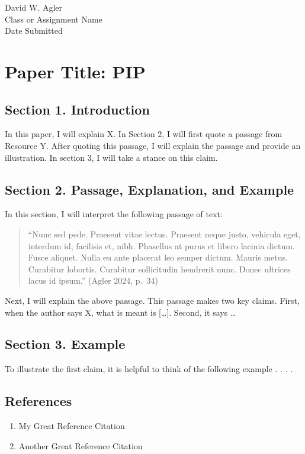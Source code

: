 David W. Agler\\
Class or Assignment Name\\
Date Submitted

\section{Paper Title: PIP}\label{paper-title-pip}

\subsection{Section 1. Introduction}\label{section-1.-introduction}

In this paper, I will explain X. In Section 2, I will first quote a
passage from Resource Y. After quoting this passage, I will explain the
passage and provide an illustration. In section 3, I will take a stance
on this claim.

\subsection{Section 2. Passage, Explanation, and
Example}\label{section-2.-passage-explanation-and-example}

In this section, I will interpret the following passage of text:

\begin{quote}
``Nunc sed pede. Praesent vitae lectus. Praesent neque justo, vehicula
eget, interdum id, facilisis et, nibh. Phasellus at purus et libero
lacinia dictum. Fusce aliquet. Nulla eu ante placerat leo semper dictum.
Mauris metus. Curabitur lobortis. Curabitur sollicitudin hendrerit nunc.
Donec ultrices lacus id ipsum.'' (Agler 2024, p.~34)
\end{quote}

Next, I will explain the above passage. This passage makes two key
claims. First, when the author says X, what is meant is {[}\ldots{]}.
Second, it says \ldots{}

\subsection{Section 3. Example}\label{section-3.-example}

To illustrate the first claim, it is helpful to think of the following
example . . . .

\subsection{References}\label{references}

\begin{enumerate}
\def\labelenumi{\arabic{enumi}.}
\tightlist
\item
  My Great Reference Citation
\item
  Another Great Reference Citation
\end{enumerate}
